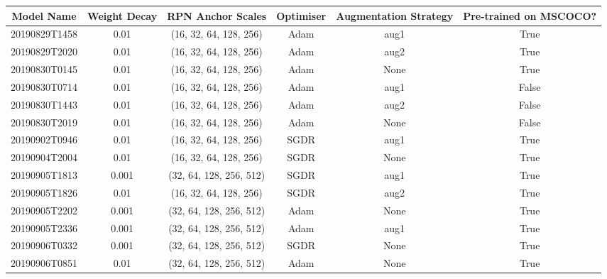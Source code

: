 \begin{table}[!ht]
	\tiny
	\begin{adjustbox}{width=\columnwidth, center}
		\begin{tabular}{cccccc}
			\toprule
			Model Name & Weight Decay &        RPN Anchor Scales & Optimiser & Augmentation Strategy & Pre-trained on MSCOCO? \\
			\midrule
			20190829T1458 &         0.01 &   (16, 32, 64, 128, 256) &      Adam &                  aug1 &                  True \\
			20190829T2020 &         0.01 &   (16, 32, 64, 128, 256) &      Adam &                  aug2 &                  True \\
			20190830T0145 &         0.01 &   (16, 32, 64, 128, 256) &      Adam &                  None &                  True \\
			20190830T0714 &         0.01 &   (16, 32, 64, 128, 256) &      Adam &                  aug1 &                   False \\
			20190830T1443 &         0.01 &   (16, 32, 64, 128, 256) &      Adam &                  aug2 &                   False \\
			20190830T2019 &         0.01 &   (16, 32, 64, 128, 256) &      Adam &                  None &                   False \\
			20190902T0946 &         0.01 &   (16, 32, 64, 128, 256) &      SGDR &                  aug1 &                  True \\
			20190904T2004 &         0.01 &   (16, 32, 64, 128, 256) &      SGDR &                  None &                  True \\
			20190905T1813 &        0.001 &  (32, 64, 128, 256, 512) &      SGDR &                  aug1 &                  True \\
			20190905T1826 &         0.01 &   (16, 32, 64, 128, 256) &      SGDR &                  aug2 &                  True \\
			20190905T2202 &        0.001 &  (32, 64, 128, 256, 512) &      Adam &                  None &                  True \\
			20190905T2336 &        0.001 &  (32, 64, 128, 256, 512) &      Adam &                  aug1 &                  True \\
			20190906T0332 &        0.001 &  (32, 64, 128, 256, 512) &      SGDR &                  None &                  True \\
			20190906T0851 &         0.01 &  (32, 64, 128, 256, 512) &      Adam &                  None &                  True \\

\end{tabular}
\end{adjustbox}
\end{table}
